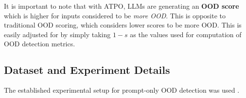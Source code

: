 It is important to note that with ATPO, LLMs are generating an \textbf{OOD score} which is higher for inputs considered to be \textit{more OOD}. This is opposite to traditional OOD scoring, which considers lower scores to be more OOD. This is easily adjusted for by simply taking $1-s$ as the values used for computation of OOD detection metrics.

\subsection{Dataset and Experiment Details}
\label{sec:app-exp}


The established experimental setup for prompt-only OOD detection was used \cite{wang2024beyond}.

